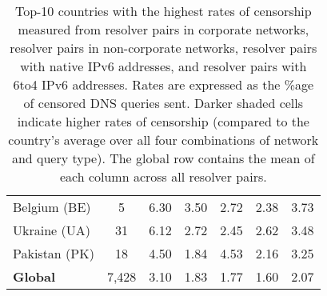 \begin{table}[h!]
{\begin{tabular}{lcccccc}
Belgium (BE) & \color{black} 5 & {\cellcolor[HTML]{6AAED6}} \color[HTML]{F1F1F1} \color{black} 6.30 & {\cellcolor[HTML]{DBE9F6}} \color[HTML]{000000} \color{black} 3.50 & {\cellcolor[HTML]{EFF6FC}} \color[HTML]{000000} \color{black} 2.72 & {\cellcolor[HTML]{F7FBFF}} \color[HTML]{000000} \color{black} 2.38 & \color{black} 3.73 \\
Ukraine (UA) & \color{black} 31 & {\cellcolor[HTML]{6CAED6}} \color[HTML]{F1F1F1} \color{black} 6.12 & {\cellcolor[HTML]{F0F6FD}} \color[HTML]{000000} \color{black} 2.72 & {\cellcolor[HTML]{F7FBFF}} \color[HTML]{000000} \color{black} 2.45 & {\cellcolor[HTML]{F3F8FE}} \color[HTML]{000000} \color{black} 2.62 & \color{black} 3.48 \\
Pakistan (PK) & \color{black} 18 & {\cellcolor[HTML]{6DAFD7}} \color[HTML]{F1F1F1} \color{black} 4.50 & {\cellcolor[HTML]{F7FBFF}} \color[HTML]{000000} \color{black} 1.84 & {\cellcolor[HTML]{6AAED6}} \color[HTML]{F1F1F1} \color{black} 4.53 & {\cellcolor[HTML]{EBF3FB}} \color[HTML]{000000} \color{black} 2.16 & \color{black} 3.25 \\
    \midrule
    {\bf Global} & \color{black} 7,428 & {\cellcolor[HTML]{6AAED6}}
    \color[HTML]{F1F1F1} \color{black} 3.10 & {\cellcolor[HTML]{DCE9F6}}
    \color[HTML]{000000} \color{black} 1.83 & {\cellcolor[HTML]{F7FBFF}}
    \color[HTML]{000000} \color{black} 1.77 & {\cellcolor[HTML]{F7FBFF}}
    \color[HTML]{000000} \color{black} 1.60 & \color{black} 2.07 \\

  \bottomrule
  \end{tabular}
  }
  \caption{Top-10 countries with the highest rates of censorship measured from
  resolver pairs in corporate networks, resolver pairs in non-corporate
  networks, resolver pairs with native IPv6 addresses, and resolver pairs with
  6to4 IPv6 addresses. Rates are expressed as the \%age of censored DNS queries
  sent. Darker shaded cells indicate higher rates of censorship (compared to
  the country's average over all four combinations of network and query type).
  The global row contains the mean of each column across all resolver pairs.}
  \label{tab:prevalence:rates}
\end{table}

